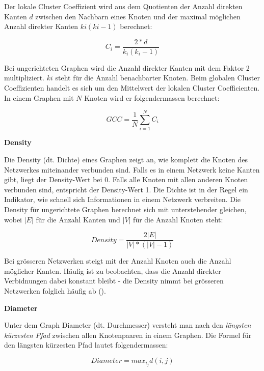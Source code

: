 Der lokale Cluster Coeffizient wird aus dem Quotienten der Anzahl direkten Kanten $d$ zwischen den Nachbarn eines Knoten und der maximal möglichen Anzahl direkter Kanten $ki(ki -1)$ berechnet:

\begin{equation}
    \label{eq:ci}
    C_i = \frac{2*d}{k_i(k_i-1)}
\end{equation}


Bei ungerichteten Graphen wird die Anzahl direkter Kanten mit dem Faktor 2 multipliziert. $ki$ steht für die Anzahl benachbarter Knoten.
Beim globalen Cluster Coeffizienten handelt es sich um den Mittelwert der lokalen Cluster Coefficienten.
In einem Graphen mit $N$ Knoten wird er folgendermassen berechnet:

\begin{equation}
    \label{eq:gcc}
    GCC = \frac{1}{N}\sum\limits_{i=1}^{N}C_i
\end{equation}

\textbf{Density}

Die Density (dt. Dichte) eines Graphen zeigt an, wie komplett die Knoten des Netzwerkes miteinander verbunden sind.
Falls es in einem Netzwerk keine Kanten gibt, liegt der Density-Wert bei 0. Falls alle Knoten mit allen anderen Knoten verbunden sind, entspricht der Density-Wert 1.
Die Dichte ist in der Regel ein Indikator, wie schnell sich Informationen in einem Netzwerk verbreiten.
Die Density für ungerichtete Graphen berechnet sich mit unterstehender gleichen, wobei $|E|$ für die Anzahl Kanten und $|V|$ für die Anzahl Knoten steht:

\begin{equation}
    \label{eq:density}
    Density = \frac{2|E|}{|V|*(|V|-1)}
\end{equation}


Bei grösseren Netzwerken steigt mit der Anzahl Knoten auch die Anzahl möglicher Kanten.
Häufig ist zu beobachten, dass die Anzahl direkter Verbidnungen dabei konstant bleibt - die Density nimmt bei grösseren Netzwerken folglich häufig ab (\cite{michael_henninger_soziale_2018}).

\textbf{Diameter}

Unter dem Graph Diameter (dt. Durchmesser) versteht man nach \cite{michael_henninger_soziale_2018} den \textit{längsten kürzesten Pfad} zwischen allen Knotenpaaren in einem Graphen.
Die Formel für den längsten kürzesten Pfad lautet folgendermassen:

\begin{equation}
    \label{eq:diameter}
    Diameter = max_i_jd(i,j)
\end{equation}

